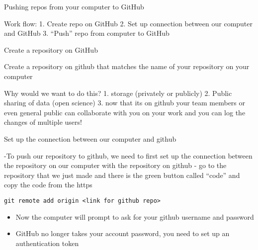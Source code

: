 \documentclass[ignorenonframetext,]{beamer}
\providecommand{\tightlist}{%
  \setlength{\itemsep}{0pt}\setlength{\parskip}{0pt}}
\begin{document}
\begin{frame}{Pushing repos from your computer to GitHub}

Work flow: 1. Create repo on GitHub 2. Set up connection between our
computer and GitHub 3. ``Push'' repo from computer to GitHub

\end{frame}

\begin{frame}{Create a repository on GitHub}

Create a repository on github that matches the name of your repository
on your computer

Why would we want to do this? 1. storage (privately or publicly) 2.
Public sharing of data (open science) 3. now that its on github your
team members or even general public can collaborate with you on your
work and you can log the changes of multiple users!

\end{frame}

\begin{frame}[fragile]{Set up the connection between our computer and
github}

-To push our repository to github, we need to first set up the
connection between the repository on our computer with the repository on
github - go to the repository that we just made and there is the green
button called ``code'' and copy the code from the https

\texttt{git\ remote\ add\ origin\ \textless{}link\ for\ github\ repo\textgreater{}}

\begin{itemize}
\tightlist
\item
  Now the computer will prompt to ask for your github username and
  password
\item
  GitHub no longer takes your account password, you need to set up an
  authentication token
\end{itemize}

\end{frame}
\end{document}
